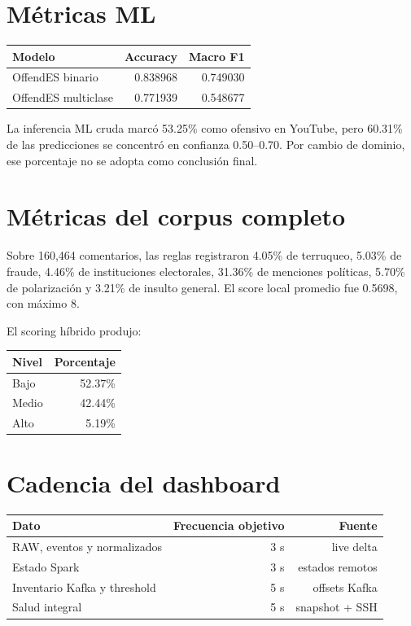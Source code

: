 \documentclass[11pt,a4paper,openany]{report}
\begin{document}
\section{Métricas ML}

\begin{tabular}{lrr}
\toprule
\textbf{Modelo} & \textbf{Accuracy} & \textbf{Macro F1}\\
\midrule
OffendES binario & 0.838968 & 0.749030\\
OffendES multiclase & 0.771939 & 0.548677\\
\bottomrule
\end{tabular}

La inferencia ML cruda marcó 53.25\% como ofensivo en YouTube, pero 60.31\% de las predicciones se concentró en confianza 0.50--0.70. Por cambio de dominio, ese porcentaje no se adopta como conclusión final.

\section{Métricas del corpus completo}

Sobre 160,464 comentarios, las reglas registraron 4.05\% de terruqueo, 5.03\% de fraude, 4.46\% de instituciones electorales, 31.36\% de menciones políticas, 5.70\% de polarización y 3.21\% de insulto general. El score local promedio fue 0.5698, con máximo 8.

El scoring híbrido produjo:

\begin{center}
\begin{tabular}{lr}
\toprule
\textbf{Nivel} & \textbf{Porcentaje}\\
\midrule
Bajo & 52.37\%\\
Medio & 42.44\%\\
Alto & 5.19\%\\
\bottomrule
\end{tabular}
\end{center}

\section{Cadencia del dashboard}

\begin{tabularx}{\textwidth}{Yrr}
\toprule
\textbf{Dato} & \textbf{Frecuencia objetivo} & \textbf{Fuente}\\
\midrule
RAW, eventos y normalizados & 3 s & live delta\\
Estado Spark & 3 s & estados remotos\\
Inventario Kafka y threshold & 5 s & offsets Kafka\\
Salud integral & 5 s & snapshot + SSH\\
\bottomrule
\end{tabularx}
\end{document}
